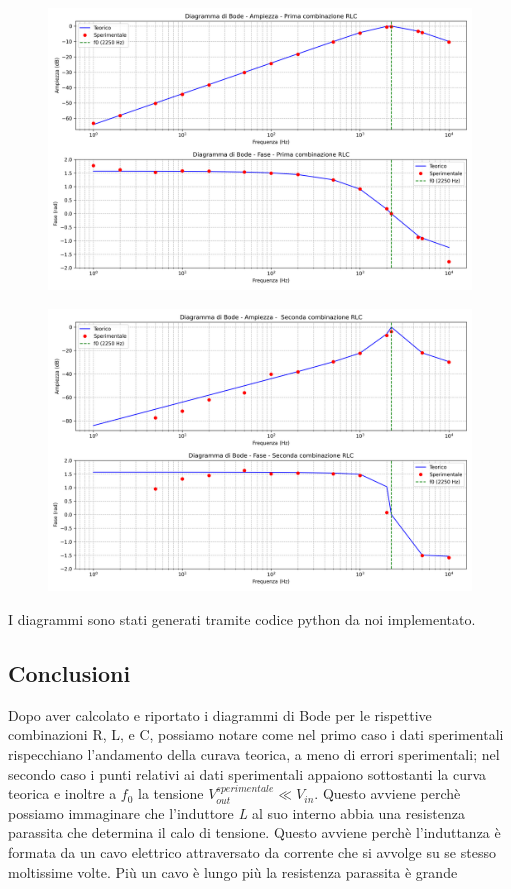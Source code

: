 \documentclass{article}
\begin{document}
 
\begin{figure}[H]
    \centering
    \includegraphics[width=0.8\linewidth]{figures/diagramma_bode_1.png}
\end{figure}
\noindent

\begin{figure}[H]
    \centering
    \includegraphics[width=0.8\linewidth]{figures/diagramma_bode_2.png}
\end{figure}
\noindent

I diagrammi sono stati generati tramite codice python da noi implementato.

\subsection{Conclusioni}
Dopo aver calcolato e riportato i diagrammi di Bode per le rispettive combinazioni R, L, e C, possiamo notare come nel primo caso i dati sperimentali rispecchiano l'andamento della curava teorica, a meno di errori sperimentali; nel secondo caso i punti relativi ai dati sperimentali appaiono sottostanti la curva teorica e inoltre a $f_0$ la tensione $V_{out}^{sperimentale} \ll V_{in}$. Questo avviene perchè possiamo immaginare che l'induttore \textit{L} al suo interno abbia una resistenza parassita che determina il calo di tensione. 
Questo avviene perchè l’induttanza è formata da un cavo elettrico attraversato da corrente che si avvolge su se stesso moltissime volte. Più un cavo è lungo più la resistenza parassita è grande
\end{document}

